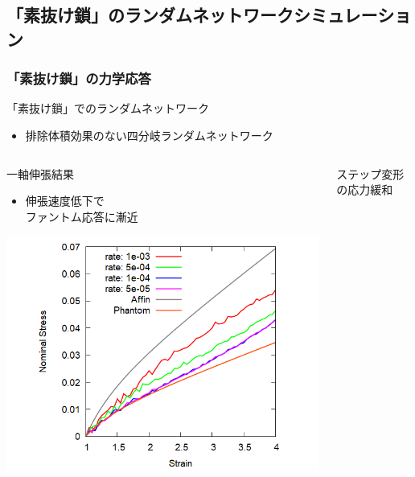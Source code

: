 \documentclass[12pt, dvipdfmx]{beamer}
\begin{document}
\subsection{「素抜け鎖」のランダムネットワークシミュレーション}
\begin{frame}
	\frametitle{「素抜け鎖」の力学応答}
		\begin{alertblock}{「素抜け鎖」でのランダムネットワーク}
			\begin{itemize}
				\item 排除体積効果のない四分岐ランダムネットワーク
			\end{itemize}
        \end{alertblock}
        \vspace{-3mm}
		\begin{columns}[totalwidth=\linewidth]
				\begin{block}{一軸伸張結果}
					\begin{itemize}
						\item 伸張速度低下で\\\alert{ファントム応答}に漸近
                    \end{itemize}
                    \begin{center}
                        \includegraphics[width=.9\columnwidth]{N48_sunuke.png}
                    \end{center}
				\end{block}
				\begin{exampleblock}{ステップ変形の応力緩和}
                    \begin{itemize}

\end{itemize}
\end{exampleblock}
\end{columns}
\end{frame}
\end{document}
